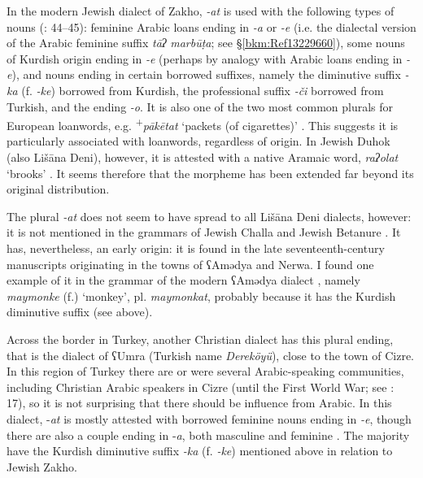 \documentclass[output=paper]{langsci/langscibook}
\begin{document}
In the modern Jewish dialect of Zakho, \textit{\nobreakdash-at} is used with the following types of nouns (\citealt{Sabar2002}: 44–45): feminine Arabic loans ending in \textit{\nobreakdash-a} or \textit{\nobreakdash-e} (i.e. the dialectal version of the Arabic feminine suffix \textit{tāʔ} \textit{marbūṭa}; see §\ref{bkm:Ref13229660}), some nouns of Kurdish origin ending in \textit{\nobreakdash-e} (perhaps by analogy with Arabic loans ending in \textit{\nobreakdash-e}), and nouns ending in certain borrowed suffixes, namely the diminutive suffix \textit{\nobreakdash-ka} (f. \textit{\nobreakdash-ke}) borrowed from Kurdish, the professional suffix \textit{{}-či} borrowed from Turkish, and the ending \textit{\nobreakdash-o}. It is also one of the two most common plurals for European loanwords, e.g. \textsuperscript{+}\textit{pākētat} ‘packets (of cigarettes)’ \citep[57]{Sabar1990}. This suggests it is particularly associated with loanwords, regardless of origin. In Jewish Duhok (also Lišāna Deni), however, it is attested with a native Aramaic word, \textit{raʔolat} ‘brooks’ \citep[45]{Sabar2002}. It seems therefore that the morpheme has been extended far beyond its original distribution.

The plural \textit{{}-at} does not seem to have spread to all Lišāna Deni dialects, however: it is not mentioned in the grammars of Jewish Challa \citep{Fassberg2010} and Jewish Betanure \citep{Mutzafi2008}. It has, nevertheless, an early origin: it is found in the late seventeenth-century manuscripts originating in the towns of ʕAmədya and Nerwa. I found one example of it in the grammar of the modern ʕAmədya dialect \citep[70]{Greenblatt2011}, namely \textit{maymonke} (f.) ‘monkey’, pl. \textit{maymonkat}, probably because it has the Kurdish diminutive suffix (see above).

Across the border in Turkey, another Christian dialect has this plural ending, that is the dialect of ʕUmra (Turkish name \textit{Dereköyü}), close to the town of Cizre. In this region of Turkey there are or were several Arabic-speaking communities, including Christian Arabic speakers in Cizre (until the First World War; see \citealt{Jastrow1978}: 17), so it is not surprising that there should be influence from Arabic. In this dialect, \nobreakdash-\textit{at} is mostly attested with borrowed feminine nouns ending in \textit{\nobreakdash-e}, though there are also a couple ending in \nobreakdash-\textit{a}, both masculine and feminine \citep[114]{Hobrack2000}. The majority have the Kurdish diminutive suffix \textit{\nobreakdash-ka} (f. \textit{\nobreakdash-ke}) mentioned above in relation to Jewish Zakho.
\end{document}
